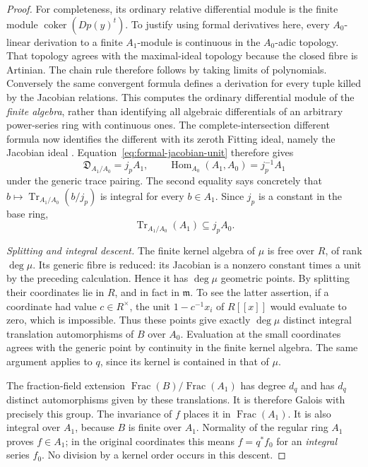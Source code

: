 \begin{proof}
For completeness, its ordinary relative differential module is the finite
module $\operatorname{coker}(Dp(y)^{t})$.  To justify using formal
derivatives here, every $A_0$-linear derivation to a finite $A_1$-module
is continuous in the $A_0$-adic topology.  That topology agrees with the
maximal-ideal topology because the closed fibre is Artinian.  The chain
rule therefore follows by taking limits of polynomials.  Conversely the
same convergent formula defines a derivation for every tuple killed by
the Jacobian relations.  This computes the ordinary differential module
of the \emph{finite algebra}, rather than identifying all algebraic
differentials of an arbitrary power-series ring with continuous ones.
The complete-intersection different formula now identifies the different
with its zeroth Fitting ideal, namely the Jacobian ideal
\cite{stacks-formal-trace-different}.  Equation~\eqref{eq:formal-jacobian-unit}
therefore gives
\[
 \mathfrak D_{A_1/A_0}=j_p A_1,\qquad
 \operatorname{Hom}_{A_0}(A_1,A_0)=j_p^{-1}A_1
\]
under the generic trace pairing.  The second equality says concretely
that $b\mapsto\operatorname{Tr}_{A_1/A_0}(b/j_p)$ is integral for every
$b\in A_1$.  Since $j_p$ is a constant in the base ring,
\begin{equation}\label{eq:formal-trace-jacobian-divisibility}
                   \operatorname{Tr}_{A_1/A_0}(A_1)\subseteq j_p A_0.
\end{equation}

\emph{Splitting and integral descent.}
The finite kernel algebra of $\mu$ is free over $R$, of rank $\deg\mu$.
Its generic fibre is reduced: its Jacobian is a nonzero constant times a
unit by the preceding calculation.  Hence it has $\deg\mu$ geometric
points.  By splitting their coordinates lie in $R$, and in fact in
$\mathfrak m$.  To see the latter assertion, if a coordinate had value
$c\in R^\times$, the unit $1-c^{-1}x_i$ of $R[[x]]$ would evaluate to
zero, which is impossible.  Thus these points give exactly $\deg\mu$
distinct integral translation automorphisms of $B$ over $A_0$.
Evaluation at the small coordinates agrees with the generic point by
continuity in the finite kernel algebra.  The same argument applies to
$q$, since its kernel is contained in that of $\mu$.

The fraction-field extension $\operatorname{Frac}(B)/\operatorname{Frac}(A_1)$
has degree $d_q$ and has $d_q$ distinct automorphisms given by these
translations.  It is therefore Galois with precisely this group.
The invariance of $f$ places it in $\operatorname{Frac}(A_1)$.
It is also integral over $A_1$, because $B$ is finite over $A_1$.
Normality of the regular ring $A_1$ proves $f\in A_1$; in the original
coordinates this means $f=q^*f_0$ for an \emph{integral} series $f_0$.
No division by a kernel order occurs in this descent.


\end{proof}

